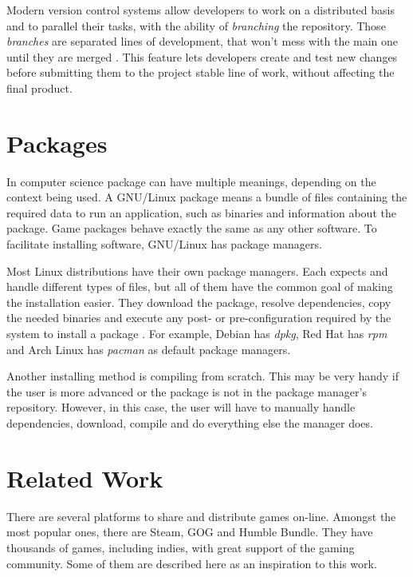 Modern version control systems allow developers to work on a distributed basis and to parallel their tasks, with the ability of \textit{branching} the repository. Those \textit{branches} are separated lines of development, that won't mess with the main one until they are merged \cite{westby2015git}. This feature lets developers create and test new changes before submitting them to the project stable line of work, without affecting the final product.

\section{Packages}
\label {sec:packages}

In computer science package can have multiple meanings, depending on the context being used. A GNU/Linux package means a bundle of files containing the required data to run an application, such as binaries and information about the package. Game packages behave exactly the same as any other software. To facilitate installing software, GNU/Linux has package managers.

Most Linux distributions have their own package managers. Each expects and handle different types of files, but all of them have the common goal of making the installation easier. They download the package, resolve dependencies, copy the needed binaries and execute any post- or pre-configuration required by the system to install a package \cite{linode2017linux}. For example, Debian has \textit{dpkg}, Red Hat has \textit{rpm} and Arch Linux has \textit{pacman} as default package managers.

Another installing method is compiling from scratch. This may be very handy if the user is more advanced or the package is not in the package manager's repository. However, in this case, the user will have to manually handle dependencies, download, compile and do everything else the manager does.


\section{Related Work}
\label {sec:relate_work}

There are several platforms to share and distribute games on-line. Amongst the most popular ones, there are Steam, GOG and Humble Bundle. They have thousands of games, including indies, with great support of the gaming community. Some of them are described here as an inspiration to this work.

